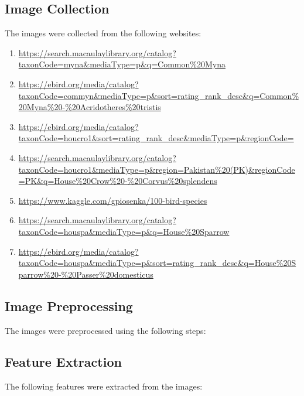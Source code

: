\documentclass{article}
\begin{document}
    \subsection*{Image Collection}
    The images were collected from the following websites:
    \begin{enumerate}
        \item \url{https://search.macaulaylibrary.org/catalog?taxonCode=myna&mediaType=p&q=Common%20Myna}
        \item \url{https://ebird.org/media/catalog?taxonCode=commyn&mediaType=p&sort=rating_rank_desc&q=Common%20Myna%20-%20Acridotheres%20tristis}
        \item \url{https://ebird.org/media/catalog?taxonCode=houcro1&sort=rating_rank_desc&mediaType=p&regionCode=}
        \item \url{https://search.macaulaylibrary.org/catalog?taxonCode=houcro1&mediaType=p&region=Pakistan%20(PK)&regionCode=PK&q=House%20Crow%20-%20Corvus%20splendens}
        \item \url{https://www.kaggle.com/gpiosenka/100-bird-species}
        \item \url{https://search.macaulaylibrary.org/catalog?taxonCode=houspa&mediaType=p&q=House%20Sparrow}
        \item \url{https://ebird.org/media/catalog?taxonCode=houspa&mediaType=p&sort=rating_rank_desc&q=House%20Sparrow%20-%20Passer%20domesticus}
    \end{enumerate}

    \subsection*{Image Preprocessing}
    The images were preprocessed using the following steps:

    \subsection*{Feature Extraction}
    The following features were extracted from the images:
\end{document}
